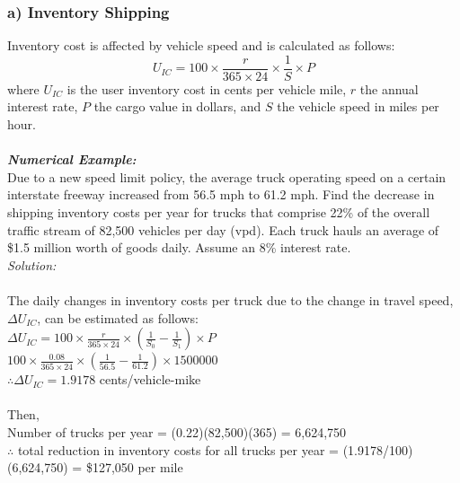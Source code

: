 \subsubsection{a) Inventory Shipping}
Inventory cost is affected by vehicle speed and is calculated as follows:
\begin{equation}
	U_{IC} = 100 \times \frac{r}{365 \times 24} \times \frac{1}{S} \times P
\end{equation}
where $ U_{IC} $ is the user inventory cost in cents per vehicle mile, $ r $ the annual interest rate, $ P $ the cargo value in dollars, and $ S $ the vehicle speed in miles per hour.\\\\
\textbf{\textit{Numerical Example:}}\\
Due to a new speed limit policy, the average truck operating speed on a certain interstate freeway increased from 56.5 mph to 61.2 mph. Find the decrease in shipping inventory costs per year for trucks that comprise 22\% of the overall traffic stream of 82,500 vehicles per day (vpd). Each truck hauls an average of \$1.5 million worth of goods daily. Assume an 8\% interest rate.\\
\textit{Solution:}\\\\
The daily changes in inventory costs per truck due to the change in travel speed, $ \Delta U_{IC} $, can be estimated as follows:\\
$ \Delta U_{IC} = 100 \times \frac{r}{365 \times 24} \times \left( \frac{1}{S_0} - \frac{1}{S_1} \right) \times P$\\
$ 100 \times \frac{0.08}{365 \times 24} \times \left( \frac{1}{56.5} - \frac{1}{61.2} \right) \times 1500000 $\\
$ \therefore \Delta U_{IC} = 1.9178 $ cents/vehicle-mike\\\\
Then,\\
Number of trucks per year = (0.22)(82,500)(365) = 6,624,750\\
$ \therefore $ total reduction in inventory costs for all trucks per year = (1.9178/100)(6,624,750) = \$127,050 per mile
